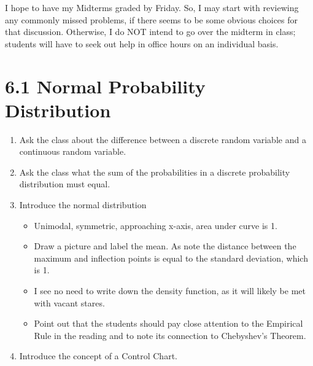I hope to have my Midterms graded by Friday. So, I may start with reviewing any commonly missed problems, if there seems to be some obvious choices for that discussion. Otherwise, I do NOT intend to go over the midterm in class; students will have to seek out help in office hours on an individual basis.
 
\section*{6.1 Normal Probability Distribution}

    \begin{enumerate}
    
        \item Ask the class about the difference between a discrete random variable and a continuous random variable.
        
        \item Ask the class what the sum of the probabilities in a discrete probability distribution must equal.
        
        \item Introduce the normal distribution
        
            \begin{itemize}
            
                \item Unimodal, symmetric, approaching x-axis, area under curve is 1.  
                
                \item Draw a picture and label the mean. As note the distance between the maximum and inflection points is equal to the standard deviation, which is 1.
                
                \item I see no need to write down the density function, as it will likely be met with vacant stares.
                
                \item Point out that the students should pay close attention to the Empirical Rule in the reading and to note its connection to Chebyshev’s Theorem.
            
            \end{itemize}
            
        \item Introduce the concept of a Control Chart.
        
            \begin{itemize}
            

\end{itemize}
\end{enumerate}
